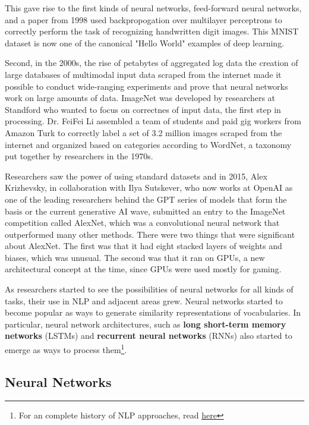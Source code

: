 \documentclass[11pt, table]{diazessay} %
\begin{document}
\begin{sloppypar}
This gave rise to the first kinds of neural networks, feed-forward neural networks, and a paper from 1998 used backpropogation over multilayer perceptrons to correctly perform the task of recognizing handwritten digit images\citep{lecun1998gradient}. This MNIST dataset is now one of the canonical "Hello World" examples of deep learning. 

Second, in the 2000s, the rise of petabytes of aggregated log data the creation of large databases of multimodal input data scraped from the internet made it possible to conduct wide-ranging experiments and prove that neural networks work on large amounts of data. ImageNet was developed by researchers at Standford who wanted to focus on correctnes of input data, the first step in processing. Dr. FeiFei Li assembled a team of students and paid gig workers from Amazon Turk to correctly label a set of 3.2 million images scraped from the internet and organized based on categories according to WordNet, a taxonomy put together by researchers in the 1970s\citep{russakovsky2015imagenet}. 

Researchers saw the power of using standard datasets and in 2015, Alex Krizhevsky, in collaboration with Ilya Sutskever, who now works at OpenAI as one of the leading researchers behind the GPT series of models that form the basis or the current generative AI wave, submitted an entry to the ImageNet competition called AlexNet, which was a convolutional neural network that outperformed many other methods. There were two things that were significant about AlexNet. The first was that it had eight stacked layers of weights and biases, which was unusual. The second was that it ran on GPUs, a new architectural concept at the time, since GPUs were used mostly for gaming. 

As researchers started to see the possibilities of neural networks for all kinds of tasks, their use in NLP and adjacent areas grew. Neural networks started to become popular as ways to generate similarity representations of vocabularies. In particular, neural network architectures, such as \textbf{long short-term memory networks} (LSTMs) and \textbf{recurrent neural networks} (RNNs) also started to emerge as ways to process them\footnote{For an complete history of NLP approaches, read  \href{https://www.ruder.io/a-review-of-the-recent-history-of-nlp/}{here}}. 


\subsection{Neural Networks}


\end{sloppypar}
\end{document}
